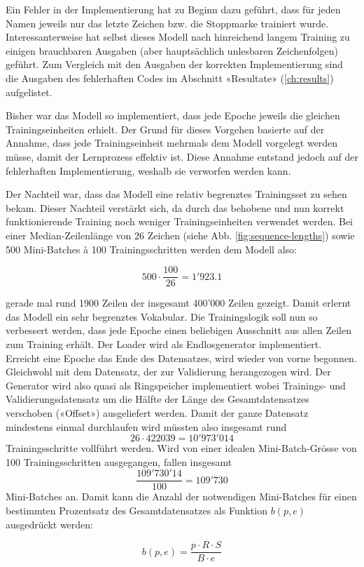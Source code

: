 Ein Fehler in der Implementierung hat zu Beginn dazu geführt, dass für jeden Namen jeweils nur das letzte Zeichen bzw. die Stoppmarke trainiert wurde.
Interessanterweise hat selbst dieses Modell nach hinreichend langem Training zu einigen brauchbaren Ausgaben (aber hauptsächlich unlesbaren Zeichenfolgen) geführt.
Zum Vergleich mit den Ausgaben der korrekten Implementierung sind die Ausgaben des fehlerhaften Codes im Abschnitt «Resultate» (\ref{ch:results}) aufgelistet.

Bisher war das Modell so implementiert, dass jede Epoche jeweils die gleichen Trainingseinheiten erhielt.
Der Grund für dieses Vorgehen basierte auf der Annahme, dass jede Trainingseinheit mehrmals dem Modell vorgelegt werden müsse, damit der Lernprozess effektiv ist.
Diese Annahme entstand jedoch auf der fehlerhaften Implementierung, weshalb sie verworfen werden kann.

Der Nachteil war, dass das Modell eine relativ begrenztes Trainingsset zu sehen bekam.
Dieser Nachteil verstärkt sich, da durch das behobene und nun korrekt funktionierende Training noch weniger Trainingseinheiten verwendet werden.
Bei einer Median-Zeilenlänge von 26 Zeichen (siehe Abb. \ref{fig:sequence-lengths}) sowie 500 Mini-Batches à 100 Trainingsschritten werden dem Modell also:

\[ 500 \cdot \frac{100}{26} = 1'923.1 \]

gerade mal rund 1900 Zeilen der insgesamt 400'000 Zeilen gezeigt.
Damit erlernt das Modell ein sehr begrenztes Vokabular.
Die Trainingslogik soll nun so verbessert werden, dass jede Epoche einen beliebigen Ausschnitt aus allen Zeilen zum Training erhält.
Der Loader wird als Endlosgenerator implementiert.
Erreicht eine Epoche das Ende des Datensatzes, wird wieder von vorne begonnen.
Gleichwohl mit dem Datensatz, der zur Validierung herangezogen wird.
Der Generator wird also quasi als Ringspeicher implementiert wobei Trainings- und Validierungsdatensatz um die Hälfte der Länge des Gesamtdatensatzes
verschoben («Offset») ausgeliefert werden.
Damit der ganze Datensatz mindestens einmal durchlaufen wird müssten also insgesamt rund \[ 26 \cdot 422039 = 10'973'014 \] Trainingsschritte vollführt werden.
Wird von einer idealen Mini-Batch-Grösse von 100 Trainingsschritten ausgegangen, fallen insgesamt \[ \frac{109'730'14}{100} = 109'730 \] Mini-Batches an.
Damit kann die Anzahl der notwendigen Mini-Batches für einen bestimmten Prozentsatz des Gesamtdatensatzes als Funktion $ b(p, e) $ ausgedrückt werden:

\[ b(p, e) = \frac{p \cdot R \cdot S}{B \cdot e} \]

